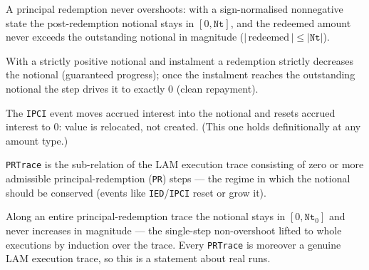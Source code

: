 \begin{theorem}\label{thm:no-overshoot}
        \leanok
        A principal redemption never overshoots: with a sign-normalised
        nonnegative state the post-redemption notional stays in $[0, \mathtt{Nt}]$,
        and the redeemed amount never exceeds the outstanding notional in
        magnitude ($|\,\mathrm{redeemed}\,| \le |\mathtt{Nt}|$).
\end{theorem}

\begin{theorem}\label{thm:amortization}
        \leanok
        With a strictly positive notional and instalment a redemption strictly
        decreases the notional (guaranteed progress); once the instalment
        reaches the outstanding notional the step drives it to exactly $0$
        (clean repayment).
\end{theorem}

\begin{theorem}\label{thm:ipci}
        \leanok
        The \texttt{IPCI} event moves accrued interest into the notional and
        resets accrued interest to $0$: value is relocated, not created.  (This
        one holds definitionally at any amount type.)
\end{theorem}

\begin{definition}\label{def:prtrace}
        \leanok
        \texttt{PRTrace} is the sub-relation of the LAM execution trace
        consisting of zero or more admissible principal-redemption (\texttt{PR})
        steps --- the regime in which the notional should be conserved (events
        like \texttt{IED}/\texttt{IPCI} reset or grow it).
\end{definition}

\begin{theorem}\label{thm:conservation}
        \leanok
        Along an entire principal-redemption trace the notional stays in
        $[0, \mathtt{Nt}_0]$ and never increases in magnitude --- the
        single-step non-overshoot lifted to whole executions by induction over
        the trace.  Every \texttt{PRTrace} is moreover a genuine LAM execution
        trace, so this is a statement about real runs.
\end{theorem}

